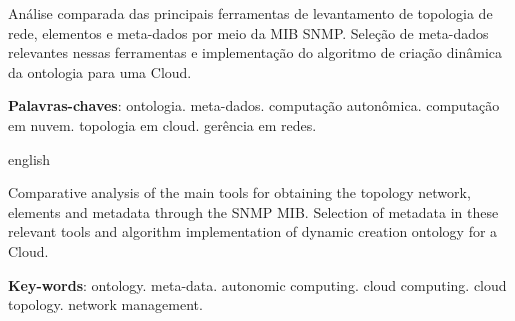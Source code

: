 \documentclass[12pt,openright,twoside,a4paper,english,brazil]{abntex2}
\begin{document}


\begin{resumo}

Análise comparada das principais ferramentas de levantamento de topologia de
rede, elementos e meta-dados por meio da MIB SNMP. Seleção de meta-dados
relevantes nessas ferramentas e implementação do algoritmo de criação dinâmica
da ontologia para uma Cloud.
 \vspace{\onelineskip}
    
 \noindent
 \textbf{Palavras-chaves}: ontologia. meta-dados. computação autonômica.
 computação em nuvem. topologia em cloud. gerência em redes.
\end{resumo}

\begin{resumo}[Abstract]
 \begin{otherlanguage*}{english}
 
Comparative analysis of the main tools for obtaining the topology network,
elements and metadata through the SNMP MIB. Selection of metadata in these
relevant tools and algorithm implementation of dynamic creation ontology for a
Cloud.

   \vspace{\onelineskip}
 
   \noindent 
   \textbf{Key-words}: ontology. meta-data. autonomic computing. cloud
   computing. cloud topology. network management.
 \end{otherlanguage*}
\end{resumo}




\textual
\end{document}
